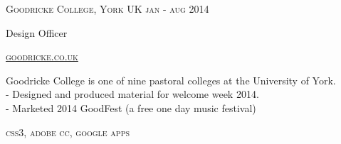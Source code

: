 {
    \textsc{\small{Goodricke College, York UK
        \hfill
            {\raggedleft
                jan - aug 2014
            } \\
        }
    }
    {\raggedright\large {
        Design Officer
    } \\}

    \textsc{\small\href{http://www.goodricke.com}{goodricke.co.uk}}

    \normalsize{
        Goodricke College is one of nine pastoral colleges at the University of York.\\
        - Designed and produced material for welcome week 2014. \\
        - Marketed 2014 GoodFest (a free one day music festival)
    }

    \textsc{\small{\color{highlight}
        css3,
        adobe cc,
        google apps
    }}
}
